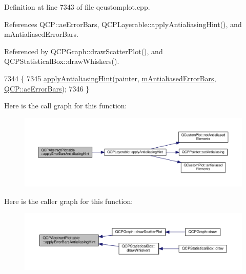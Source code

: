 Definition at line 7343 of file qcustomplot.\+cpp.



References Q\+C\+P\+::ae\+Error\+Bars, Q\+C\+P\+Layerable\+::apply\+Antialiasing\+Hint(), and m\+Antialiased\+Error\+Bars.



Referenced by Q\+C\+P\+Graph\+::draw\+Scatter\+Plot(), and Q\+C\+P\+Statistical\+Box\+::draw\+Whiskers().


\begin{DoxyCode}
7344 \{
7345   \hyperlink{class_q_c_p_layerable_a62bd552d1a45aa9accb24b310542279e}{applyAntialiasingHint}(painter, \hyperlink{class_q_c_p_abstract_plottable_ad48660b2bd301576e92fb033d8f455ea}{mAntialiasedErrorBars}, 
      \hyperlink{namespace_q_c_p_ae55dbe315d41fe80f29ba88100843a0ca9dcf3882cb321bb305f71fdc0f09f63d}{QCP::aeErrorBars});
7346 \}
\end{DoxyCode}


Here is the call graph for this function\+:\nopagebreak
\begin{figure}[H]
\begin{center}
\leavevmode
\includegraphics[width=350pt]{class_q_c_p_abstract_plottable_af687bfe6160255960558eb71f1f81e73_cgraph}
\end{center}
\end{figure}




Here is the caller graph for this function\+:\nopagebreak
\begin{figure}[H]
\begin{center}
\leavevmode
\includegraphics[width=350pt]{class_q_c_p_abstract_plottable_af687bfe6160255960558eb71f1f81e73_icgraph}
\end{center}
\end{figure}


